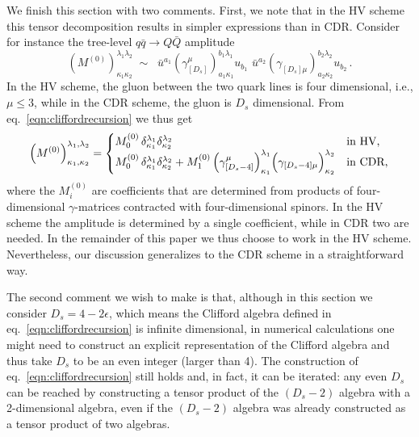 We finish this section with two comments. First, we note that in the
HV scheme this tensor decomposition results in simpler expressions
than in CDR. Consider for instance the tree-level $q\bar q\to Q\bar
Q$ amplitude
\begin{equation}
	\left(M^{(0)}\right)_{\kappa_1 \kappa_2}^{\lambda_1 \lambda_2}
	\;\sim\;\; 
        \bar u^{a_1}
	\left(
	\gamma_{[D_s]}^\mu
	\right)_{a_1 \kappa_1}^{b_1 \lambda_1}
	u_{b_1}
        \,\,
	\bar u^{a_2}
	\left(
	\gamma_{[D_s]\mu}
	\right)_{a_2 \kappa_2}^{b_2 \lambda_2}
	u_{b_2}
	\,.
\end{equation}
In the HV scheme, the gluon between the two quark lines is
four dimensional, i.e., $\mu\leq3$, while
in the CDR scheme, the gluon is $D_s$ dimensional.
From eq.~\eqref{eqn:cliffordrecursion} we thus get
\begin{equation}\label{eq:HVvsCDR}
	\left(M^{(0)}\right)_{\kappa_1,\kappa_2}^{\lambda_1,\lambda_2}
	=\begin{cases}
	M^{(0)}_{0}\, \delta_{\kappa_1}^{\lambda_1}
	\delta_{\kappa_2}^{\lambda_2}& \textrm{in HV,}\\
	M^{(0)}_{0}\, \delta_{\kappa_1}^{\lambda_1}
	\delta_{\kappa_2}^{\lambda_2}+
	M^{(0)}_{1}\,\Bigl(\gamma_{[D_s-4]}^{\mu}\Bigl)_{\kappa_1}^
	{\lambda_1}
	\Bigl(\gamma_{[D_s-4]\mu}\Bigl)_{\kappa_2}^{\lambda_2}
	&\textrm{in CDR,}
	\end{cases}
\end{equation}
where the $M_i^{(0)}$ are coefficients that are determined from
products of four-dimensional $\gamma$-matrices contracted with
four-dimensional spinors.
In the HV scheme the amplitude is
determined by a single coefficient, 
while in CDR two are needed. In the
remainder of this paper we thus choose to work in the HV scheme.
Nevertheless, our discussion
generalizes to the CDR scheme in a straightforward way.

The second comment we wish to make is that, 
although in this section we consider $D_s=4-2\epsilon$, which
means the Clifford algebra defined in 
eq.~\eqref{eqn:cliffordrecursion} is infinite dimensional, in
numerical calculations one might need to construct an explicit
representation of the Clifford algebra and thus
take $D_s$ to be an even integer (larger than 4).
The construction 
of eq.~\eqref{eqn:cliffordrecursion} still holds and, in fact, 
it can be iterated: any even $D_s$ can be reached
by constructing a tensor product of the
$(D_s-2)$ algebra with a 2-dimensional algebra, even if the 
$(D_s-2)$ algebra 
was already constructed as a tensor product of two
algebras.

